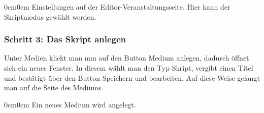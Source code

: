 \documentclass[parskip=off,index=totocnumbered]{scrartcl}
\newenvironment{rückkeinstück}
	{\begin{adjustwidth}{0cm}{0cm}\footnotesize \singlespace \centering} 
	{\end{adjustwidth} \onehalfspacing}
\begin{document}
\noindent \begin{minipage}{\textwidth}
    \begin{rückkeinstück}
        Einstellungen auf der Editor-Veranstaltungsseite. Hier kann der Skriptmodus gewählt werden.
        \vspace{0.6cm}
    \end{rückkeinstück}
\end{minipage}


\subsubsection*{Schritt 3: Das Skript anlegen}
Unter \textsf{Medien} klickt man nun auf den Button \colorbox{LightSteelBlue3!50!}{\textsf{Medium anlegen}}, dadurch öffnet sich ein neues Fenster. In diesem wählt man den Typ \textsf{Skript}, vergibt einen Titel und bestätigt über den Button \colorbox{LightSteelBlue3!60!}{\textsf{Speichern und bearbeiten}}. Auf diese Weise gelangt man auf die Seite des Mediums.
\vspace{0.6cm}
              
\noindent \begin{minipage}{\textwidth}
    \begin{rückkeinstück}
        Ein neues Medium wird angelegt.
        \vspace{0.6cm}
    \end{rückkeinstück}
\end{minipage}
\end{document}
